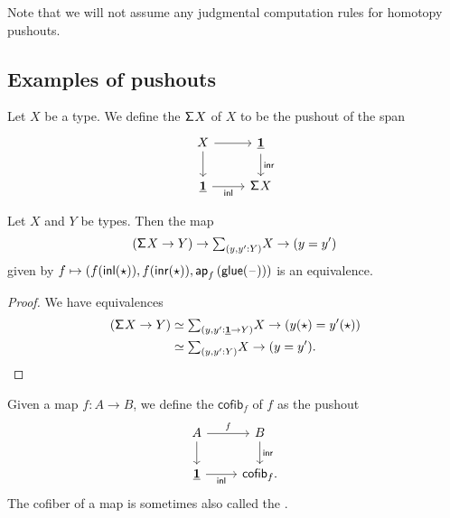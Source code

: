 \begin{rmk}
Note that we will not assume any judgmental computation rules for homotopy pushouts.
\end{rmk}

\subsection{Examples of pushouts}

\begin{defn}
Let $X$ be a type. We define the  $\mathsf{\Sigma}^{} X$ of $X$ to be the pushout of the span
\begin{equation*}
\begin{tikzcd}
X \arrow[r] \arrow[d] & \unit \arrow[d,"\inr"] \\
\unit \arrow[r,swap,"\inl"] & \susp X 
\end{tikzcd}
\end{equation*}
\end{defn}

\begin{lem}
Let $X$ and $Y$ be types. Then the map
\begin{equation*}
(\susp{X}\to Y)\to \sm{y,y':Y} X\to (y=y')
\end{equation*}
given by $f\mapsto (f({\mathsf{inl}}(\star)),f({\mathsf{inr}}(\star)),\mathsf{ap}_{f}\left({\mathsf{glue}(\mathord{\hspace{1pt}\text{--}\hspace{1pt}})}\right))$ is an equivalence.
\end{lem}

\begin{proof}
We have equivalences
\begin{align*}
(\susp{X}\to Y) & \eqvsym \sm{y,y':\unit \to Y} X\to (y(\ttt)=y'(\ttt)) \\
& \eqvsym \sm{y,y':Y} X\to (y=y').\qedhere
\end{align*}
\end{proof}

\begin{defn}
Given a map $f:A\to B$, we define the  $\mathsf{cofib}_f$ of $f$ as the pushout
\begin{equation*}
\begin{tikzcd}
A \arrow[r,"f"] \arrow[d] & B \arrow[d,"\inr"] \\
\unit \arrow[r,swap,"\inl"] & \mathsf{cofib}_f. 
\end{tikzcd}
\end{equation*}
The cofiber of a map is sometimes also called the .
\end{defn}

